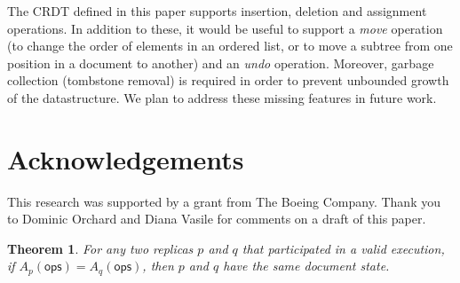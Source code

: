 \documentclass[10pt,journal,compsoc]{IEEEtran}
\newtheorem{theorem}{Theorem}
\newif\ifincludeappendix
\begin{document}
The CRDT defined in this paper supports insertion, deletion and assignment operations. In addition to these, it would be useful to support a \emph{move} operation (to change the order of elements in an ordered list, or to move a subtree from one position in a document to another) and an \emph{undo} operation. Moreover, garbage collection (tombstone removal) is required in order to prevent unbounded growth of the datastructure. We plan to address these missing features in future work.

\section*{Acknowledgements}

This research was supported by a grant from The Boeing Company. Thank you to Dominic Orchard and Diana Vasile for comments on a draft of this paper.


{}

\ifincludeappendix
\clearpage
{}\label{sec:proof}

\begin{theorem}\label{thm:convergence}
For any two replicas $p$ and $q$ that participated in a valid execution, if $A_p(\mathsf{ops}) = A_q(\mathsf{ops})$, then $p$ and $q$ have the same document state.
\end{theorem}
\end{document}
